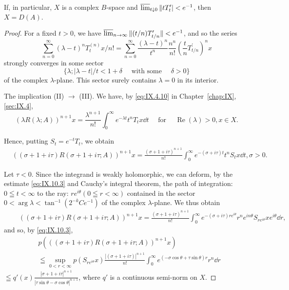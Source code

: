\begin{corollaryn} If, in particular, $X$ is a complex $B$-space and $\varlimsup\limits_{t\downarrow 0}\|tT_t'| < e^{-1}$, then $X = D(A)$.

\end{corollaryn}
\begin{proof}
 For a fixed $t > 0$, we have $\varlimsup\limits_{n \to \infty} \|(t/n) T_{t/n}'\| < e^{-1}$, and so the series 
\[
\sum\limits_{n=0} ^{\infty} (\lambda - t) ^{n} T _{t} ^{(n)} x / n! = \sum\limits_{n=0} ^{\infty} \frac {(\lambda - t) ^{n}}{t ^{n}} \frac {n ^{n}}{n !} \left(\frac {t}{n} T _{t/n} ^{\prime}\right) ^{n} x
\]
strongly converges in some sector 
\[
\{\lambda ; | \lambda - t | / t < 1 + \delta \quad \text{ with some } \quad \delta > 0 \}
\]
of the complex $\lambda$-plane. This sector surely contains $\lambda = 0$ in its interior. 


The implication (II) $\rightarrow$ (III). We have, by \eqref{eq:IX.4.10} in Chapter~\ref{chap:IX}, \ref{sec:IX.4}, 
\begin{equation}\label{eq:IX.10.4}
(\lambda R (\lambda ; A)) ^{n+1} x = \frac {\lambda^{n+1}}{n !} \int_{0} ^{\infty} e ^{- \lambda t} t ^{n} T _{t} x \dd t \quad \text{ for } \quad \operatorname{Re} (\lambda) > 0, x \in X.
\end{equation}

Hence, putting $S_{t} = e^{-t}T_{t}$, we obtain 
\[
\begin{aligned}
&((\sigma + 1 + i \tau) R (\sigma + 1 + i \tau ; A)) ^{n+1} x = \frac {(\sigma + 1 + i \tau) ^{n+1}}{n !} \int_{0} ^{\infty} e ^{-(\sigma + i \tau) t} t ^{n} S _{t} x \dd t, \sigma > 0.
\end{aligned}
\]

Let $\tau < 0$. Since the integrand is weakly holomorphic, we can deform, by the estimate \eqref{eq:IX.10.3} and Cauchy's integral theorem, the path of integration: $0 \leqq t < \infty$ to the ray: $re^{i\theta} (0 \leqq r < \infty)$ contained in the sector $0 < \arg \lambda < \tan^{-1}(2^{-k} Ce^{-1})$ of the complex $\lambda$-plane. We thus obtain 
\[
\begin{aligned}
&\quad ((\sigma + 1 + i \tau) R (\sigma + 1 + i \tau ; A)) ^{n+1} x = \frac {(\sigma + 1 + i \tau) ^{n+1}}{n !} \int_{0} ^{\infty} e ^ {- (\sigma + i \tau) r e ^{i \theta}} r ^{n} e ^{i n \theta} S _ {r e ^{i \theta}} x e ^{i \theta} \dd r,
\end{aligned}
\]
and so, by \eqref{eq:IX.10.3}, 
\[
\begin{aligned} & p \left(\left((\sigma + 1 + i \tau) R (\sigma + 1 + i \tau ; A)\right) ^{n+1} x\right) \\ & \leqq \sup\limits _{0 < r < \infty} p (S _ {r e ^{i \theta}} x) \frac {| (\sigma + 1 + i \tau) | ^{n+1}}{n !} \int_{0} ^{\infty} e ^{(- \sigma \cos \theta + \tau \sin \theta) r} r ^{n} \dd r \end{aligned}
\]
$\leqq q'(x) \frac{|\sigma + 1 + i\tau|^{n+1}}{|\tau \sin \theta - \sigma \cos \theta|^{n+1}}$, where $q'$ is a continuous semi-norm on $X$. 


\end{proof}
